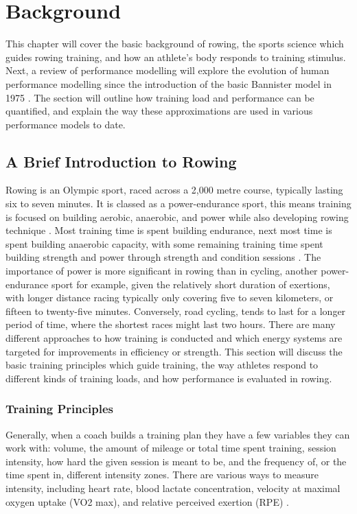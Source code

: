 \chapter{Background}
\label{ch:background}
This chapter will cover the basic background of rowing, the sports science which guides rowing training, and how an athlete's body responds to training stimulus. Next, a review of performance modelling will explore the evolution of human performance modelling since the introduction of the basic Bannister model in 1975 \autocite{Bannister1976}. The section will outline how training load and performance can be quantified, and explain the way these approximations are used in various performance models to date.

\section{A Brief Introduction to Rowing}
Rowing is an Olympic sport, raced across a 2,000 metre course, typically lasting six to seven minutes. It is classed as a power-endurance sport, this means training is focused on building aerobic, anaerobic, and power while also developing rowing technique \autocite{Mäestu2005}. Most training time is spent building endurance, next most time is spent building anaerobic capacity, with some remaining training time spent building strength and power through strength and condition sessions \autocite{Seiler2006}. The importance of power is more significant in rowing than in cycling, another power-endurance sport for example, given the relatively short duration of exertions, with longer distance racing typically only covering five to seven kilometers, or fifteen to twenty-five minutes. Conversely, road cycling, tends to last for a longer period of time, where the shortest races might last two hours. There are many different approaches to how training is conducted and which energy systems are targeted for improvements in efficiency or strength. This section will discuss the basic training principles which guide training, the way athletes respond to different kinds of training loads, and how performance is evaluated in rowing.

\subsection{\label{sub:training_principles}Training Principles}
Generally, when a coach builds a training plan they have a few variables they can work with: volume, the amount of mileage or total time spent training, session intensity, how hard the given session is meant to be, and the frequency of, or the time spent in, different intensity zones. There are various ways to measure intensity, including heart rate, blood lactate concentration, velocity at maximal oxygen uptake (VO2 max), and relative perceived exertion (RPE) \autocite{Rosenblat2019}. 

